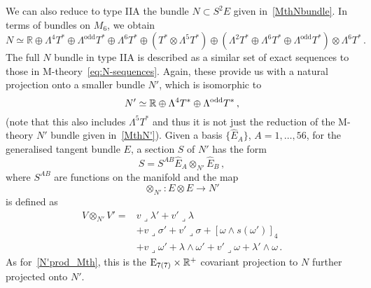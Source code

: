 \documentclass[debug]{phd}
\begin{document}
			We can also reduce to type IIA the bundle $N \subset S^2 E$ given in~\eqref{MthNbundle}. 
			In terms of bundles on $M_6$, we obtain 
					\begin{equation}\label{Nbundle}
						N \simeq \mathbb{R} \oplus \Lambda^4T^* \oplus \Lambda^{\mathrm{odd}}T^* \oplus \Lambda^6T^* \oplus (T^* \otimes \Lambda^5 T^*) \oplus (\Lambda^2T^* \oplus \Lambda^6T^* \oplus \Lambda^\mathrm{odd}T^*)\otimes \Lambda^6T^* \, .
					\end{equation}
			The full $N$ bundle in type IIA is described as a similar set of exact sequences to those in M-theory~\eqref{eq:N-sequences}. 
			Again, these provide us with a natural projection onto a smaller bundle $N'$, which is isomorphic to
					\begin{equation}\label{NprimeBundle}
						N' \simeq \mathbb{R} \oplus \Lambda^4T^* \oplus \Lambda^{\rm odd} T^* \, ,
					\end{equation}
			(note that this also includes $\Lambda^5 T^*$ and thus it is not just the reduction of the M-theory $N'$ bundle given in~\eqref{MthN'}).
			Given a basis $\{\hat E_A\}$, $A = 1,\ldots, 56$, for the generalised tangent bundle $E$, a section $S$ of $N'$ has the form
					\begin{equation}
						S = S^{AB}\hat E_A \otimes_{N'} \hat E_B \, ,
					\end{equation}
			where $S^{AB}$ are functions on the manifold and the map 
					\begin{equation}
						\otimes_{N'}: E \otimes E \longrightarrow N'
					\end{equation} 
			is defined as
					\begin{equation}\label{N'prod_IIA}
						\begin{split}
							V \otimes_{N'} V' =& v\lrcorner \lambda' + v' \lrcorner \lambda \\
										& + v \lrcorner \sigma' + v' \lrcorner \sigma + [\omega \wedge s(\omega')]_4 \\
										& + v \lrcorner \omega' + \lambda\wedge \omega' + v' \lrcorner \omega + \lambda' \wedge \omega \, .
						\end{split}
					\end{equation}
			As for~\eqref{N'prod_Mth}, this is the $\mathrm{E}_{7(7)}\times\mathbb{R}^+$ covariant projection to $N$ further projected onto $N'$.
\end{document}
